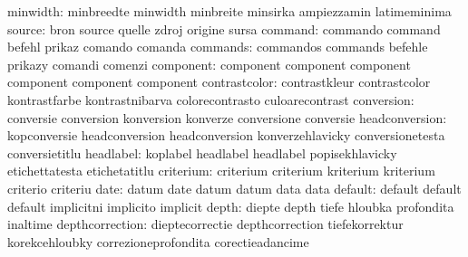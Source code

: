                  minwidth: minbreedte                minwidth
                           minbreite                 minsirka
                           ampiezzamin               latimeminima %
                   source: bron                      source
                           quelle                    zdroj
                           origine                   sursa
                  command: commando                  command
                           befehl                    prikaz
                           comando                   comanda
                 commands: commandos                 commands
                           befehle                   prikazy
                           comandi                   comenzi
component: component                 component
           component                 component
           component                 component
            contrastcolor: contrastkleur             contrastcolor
                           kontrastfarbe             kontrastnibarva
                           colorecontrasto           culoarecontrast
               conversion: conversie                 conversion
                           konversion                konverze
                           conversione               conversie
           headconversion: kopconversie              headconversion
                           headconversion            konverzehlavicky
                           conversionetesta          conversietitlu %
                headlabel: koplabel                  headlabel
                           headlabel                 popisekhlavicky
                           etichettatesta            etichetatitlu %
                criterium: criterium                 criterium
                           kriterium                 kriterium
                           criterio                  criteriu
                     date: datum                     date
                           datum                     datum
                           data                      data
                  default: default                   default
                           default                   implicitni
                           implicito                 implicit
                    depth: diepte                    depth
                           tiefe                     hloubka
                           profondita                inaltime
          depthcorrection: dieptecorrectie           depthcorrection
                           tiefekorrektur            korekcehloubky
                           correzioneprofondita      corectieadancime
